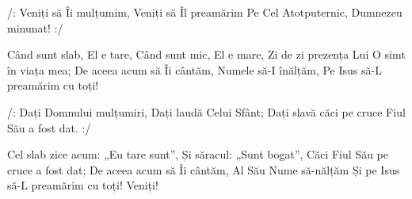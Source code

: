 \beginverse
/: Veniți să Îi mulțumim,
Veniți să Îl preamărim
Pe Cel Atotputernic,
Dumnezeu minunat! :/
\endverse

\beginchorus
Când sunt slab, El e tare,
Când sunt mic, El e mare,
Zi de zi prezența Lui
O simt în viața mea;
De aceea acum să Îi cântăm,
Numele să-I înălțăm,
Pe Isus să-L preamărim cu toți!
\endchorus

\beginverse
/: Dați Domnului mulțumiri,
Dați laudă Celui Sfânt;
Dați slavă căci pe cruce
Fiul Său a fost dat. :/
\endverse

\beginchorus
Cel slab zice acum: „Eu tare sunt”,
Și săracul: „Sunt bogat”,
Căci Fiul Său pe cruce a fost dat;
De aceea acum să Îi cântăm,
Al Său Nume să-nălțăm
Și pe Isus să-L preamărim cu toți! Veniți!
\endchorus
\endsong